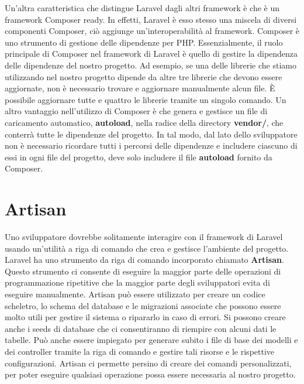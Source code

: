 Un'altra caratteristica che distingue Laravel dagli altri framework è che è un framework Composer ready. In effetti, Laravel è esso stesso una miscela di diversi componenti Composer, ciò aggiunge un'interoperabilità al framework.
Composer è uno strumento di gestione delle dipendenze per PHP. Essenzialmente, il ruolo principale di Composer nel framework di Laravel è quello di gestire la dipendenza delle dipendenze del nostro progetto. Ad esempio, se una delle librerie che stiamo utilizzando nel nostro progetto dipende da altre tre librerie che devono essere aggiornate, non è necessario trovare e aggiornare manualmente alcun file. È possibile aggiornare tutte e quattro le librerie tramite un singolo comando.
Un altro vantaggio nell'utilizzo di Composer è che genera e gestisce un file di caricamento automatico, \textbf{autoload}, nella radice della directory \textbf{vendor/}, che conterrà tutte le dipendenze del progetto. In tal modo, dal lato dello sviluppatore non è necessario ricordare tutti i percorsi delle dipendenze e includere ciascuno di essi in ogni file del progetto, deve solo includere il file \textbf{autoload} fornito da Composer. 

\pagebreak
\section{Artisan}
Uno sviluppatore dovrebbe solitamente interagire con il framework di Laravel usando un'utilità a riga di comando che crea e gestisce l'ambiente del progetto. Laravel ha uno strumento da riga di comando incorporato chiamato \textbf{Artisan}. Questo strumento ci consente di eseguire la maggior parte delle operazioni di programmazione ripetitive che la maggior parte degli sviluppatori evita di eseguire manualmente.
Artisan può essere utilizzato per creare un codice scheletro, lo schema del database e le migrazioni associate che possono essere molto utili per gestire il sistema o ripararlo in caso di errori. Si possono creare anche i seeds di database che ci consentiranno di riempire con alcuni dati le tabelle. Può anche essere impiegato per generare subito i file di base dei modelli e dei controller tramite la riga di comando e gestire tali risorse e le rispettive configurazioni. 
Artisan ci permette persino di creare dei comandi personalizzati, per poter eseguire qualsiasi operazione possa essere necessaria al nostro progetto.
